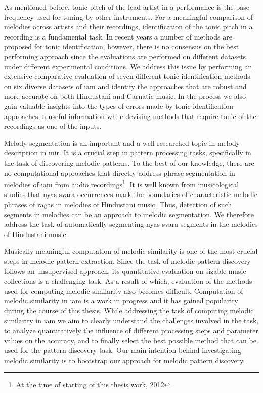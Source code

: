 As mentioned before, tonic pitch of the lead artist in a performance is the base frequency used for tuning by other instruments. For a meaningful comparison of melodies across artists and their recordings, identification of the tonic pitch in a recording is a fundamental task. In recent years a number of methods are proposed for tonic identification, however, there is no consensus on the best performing approach since the evaluations are performed on different datasets, under different experimental conditions. We address this issue by performing an extensive comparative evaluation of seven different tonic identification methods on six diverse datasets of \gls{iam} and identify the approaches that are robust and more accurate on both Hindustani and Carnatic music. In the process we also gain valuable insights into the types of errors made by tonic identification approaches, a useful information while devising methods that require tonic of the recordings as one of the inputs.

Melody segmentation is an important and a well researched topic in melody description in \gls{mir}. It is a crucial step in pattern processing tasks, specifically in the task of discovering melodic patterns. To the best of our knowledge, there are no computational approaches that directly address phrase segmentation in melodies of \gls{iam} from audio recordings\footnote{At the time of starting of this thesis work, 2012}. It is well known from musicological studies that \gls{nyas} \gls{svara} occurrences mark the boundaries of characteristic melodic phrases of \glspl{raga} in melodies of Hindustani music. Thus, detection of such segments in melodies can be an approach to melodic segmentation. We therefore address the task of automatically segmenting \gls{nyas} \gls{svara} segments in the melodies of Hindustani music. 

Musically meaningful computation of melodic similarity is one of the most crucial steps in melodic pattern extraction. Since the task of melodic pattern discovery follows an unsupervised approach, its quantitative evaluation on sizable music collections is a challenging task. As a result of which, evaluation of the methods used for computing melodic similarity also becomes difficult. Computation of melodic similarity in \gls{iam} is a work in progress and it has gained popularity during the course of this thesis. While addressing the task of computing melodic similarity in \gls{iam} we aim to clearly understand the challenges involved in the task, to analyze quantitatively the influence of different processing steps and parameter values on the accuracy, and to finally select the best possible method that can be used for the pattern discovery task. Our main intention behind investigating melodic similarity is to bootstrap our approach for melodic pattern discovery. 

